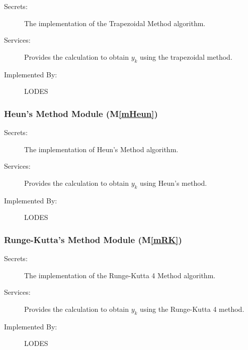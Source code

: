 \documentclass[12pt, titlepage]{article}
\newcommand{\mref}[1]{M\ref{#1}}
\begin{document}
\begin{description}
\item[Secrets:]The implementation of the Trapezoidal Method algorithm.
\item[Services:]Provides the calculation to obtain $y_k$ using the trapezoidal method.
\item[Implemented By:] LODES
\end{description}

\subsubsection{Heun's Method Module (\mref{mHeun})}

\begin{description}
\item[Secrets:]The implementation of Heun's Method algorithm.
\item[Services:]Provides the calculation to obtain $y_k$ using Heun's method.
\item[Implemented By:] LODES
\end{description}

\subsubsection{Runge-Kutta's Method Module (\mref{mRK})}

\begin{description}
\item[Secrets:]The implementation of the Runge-Kutta 4 Method algorithm.
\item[Services:]Provides the calculation to obtain $y_k$ using the Runge-Kutta 4 method.
\item[Implemented By:] LODES
\end{description}

%
\end{document}
